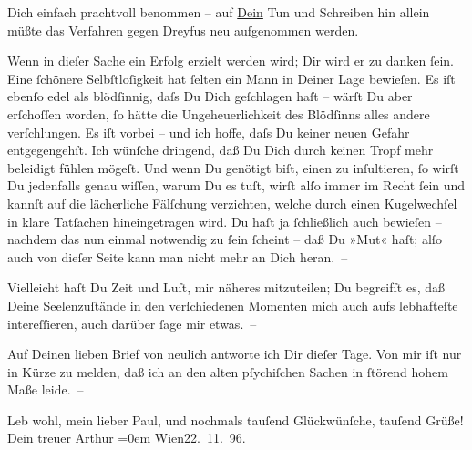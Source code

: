                Dich einfach prachtvoll benommen – auf \uline{Dein} Tun und
               Schreiben hin allein müßte das Verfahren gegen Dreyfus neu aufgenommen werden.\pend
           
\pstart
           Wenn in dieſer Sache ein Erfolg erzielt werden wird; Dir wird er zu danken ſein. Eine
               ſchönere Selbſtloſig{\pb}keit hat ſelten ein Mann in
               Deiner Lage bewieſen. Es iſt ebenſo edel als blödſinnig, daſs Du Dich geſchlagen haſt
               – wärſt Du aber erſchoſſen worden, ſo hätte die Ungeheuerlichkeit des Blödſinns alles
               andere verſchlungen. Es iſt vorbei – und ich hoffe, daſs Du keiner neuen Gefahr
                  entgegen{\pb}gehſt. Ich wünſche dringend, daß Du Dich
               durch keinen Tropf mehr beleidigt fühlen mögeſt. Und wenn Du genötigt biſt, einen zu
               inſultieren, ſo wirſt Du jedenfalls genau wiſſen, warum Du es tuſt, wirſt alſo immer
               im Recht ſein und kannſt auf die lächerliche Fälſchung verzichten, welche durch einen
               Kugelwechſel in klare Tatſachen hineingetragen wird. Du haſt ja ſchließlich auch
               bewieſen – nachdem das nun einmal notwendig zu ſein ſcheint – daß Du »Mut« haſt; alſo
               auch von dieſer Seite kann man nicht mehr an Dich heran. –\pend
           
\pstart
           {\pb}Vielleicht haſt Du Zeit und Luſt, mir näheres
               mitzuteilen; Du begreifſt es, daß Deine Seelenzuſtände in den verſchiedenen Momenten
               mich auch aufs lebhafteſte intereſſieren, auch darüber ſage mir etwas. –\pend
           
\pstart
           Auf Deinen lieben Brief von neulich antworte ich Dir dieſer Tage. Von mir iſt nur in
               Kürze zu melden, daß ich an den alten pſychiſchen Sachen in ſtörend hohem Maße
               leide. –\pend
           
\pstart
           Leb wohl, mein lieber Paul, und nochmals tauſend Glückwünſche, tauſend Grüße!
               {\\[\baselineskip]}Dein treuer \spacefill\mbox{Arthur}\pend
           \leftskip=0em{}
\pstart
           Wien22. 11. 96.\pend
           \endnumbering{}  
      